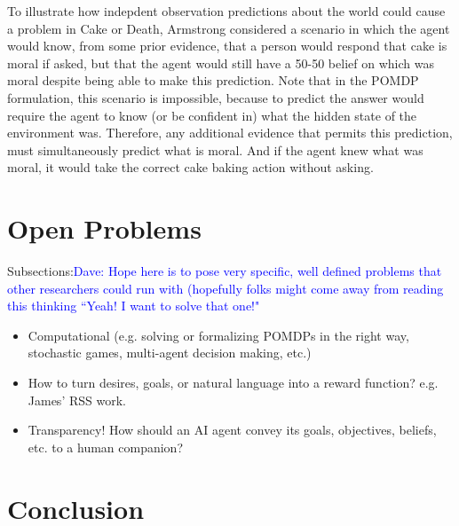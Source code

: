 \documentclass[11pt]{article}
\newcommand\davenote[1]{\textcolor{blue}{Dave: #1}}
\begin{document}
To illustrate how indepdent observation predictions about the world could cause a problem in Cake or Death, Armstrong considered a scenario in which the agent would know, from some prior evidence, that a person would respond that cake is moral if asked, but that the agent would still have a 50-50 belief on which was moral despite being able to make this prediction. Note that in the POMDP formulation, this scenario is impossible, because to predict the answer would require the agent to know (or be confident in) what the hidden state of the environment was. Therefore, any additional evidence that permits this prediction, must simultaneously predict what is moral. And if the agent knew what was moral, it would take the correct cake baking action without asking.




\section{Open Problems}

Subsections:\davenote{Hope here is to pose very specific, well defined problems that other researchers could run with (hopefully folks might come away from reading this thinking ``Yeah! I want to solve that one!"}
\begin{itemize}
\item Computational (e.g. solving or formalizing POMDPs in the right way, stochastic games, multi-agent decision making, etc.)
\item How to turn desires, goals, or natural language into a reward function? e.g. James' RSS work.
\item Transparency! How should an AI agent convey its goals, objectives, beliefs, etc. to a human companion?
\end{itemize}


\section{Conclusion}




\end{document}
